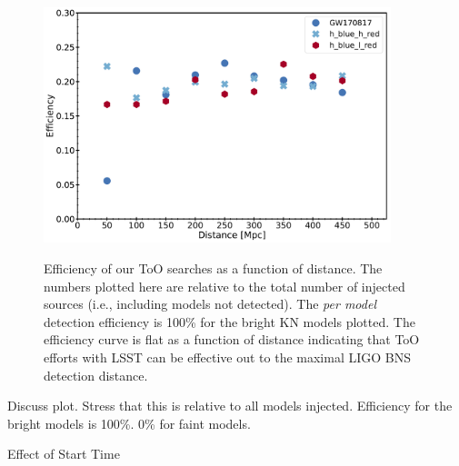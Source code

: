 \begin{figure}[!t]
\begin{center}
\hspace*{-0.1in}
\scalebox{1.}
{\includegraphics[width=0.9\textwidth]{./figs/chapter6/f5.pdf}}
\caption{\singlespace Efficiency of our ToO searches as a function of distance. The numbers plotted here are relative to the total number of injected sources (i.e., including models not detected). The {\it per model} detection efficiency is 100\% for the bright KN models plotted. The efficiency curve is flat as a function of distance indicating that ToO efforts with LSST can be effective out to the maximal LIGO BNS detection distance.}
\label{fig:ch6_dist_eff}
\end{center}
\end{figure}

Discuss plot. Stress that this is relative to all models injected. Efficiency for the bright models is 100\%. 0\% for faint models.

Effect of Start Time

